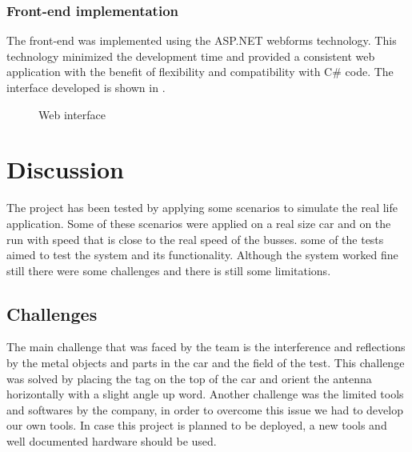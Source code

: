 \documentclass[a4paper,twoside]{IEEEtran}
\begin{document}
\subsubsection{Front-end implementation}
The front-end was implemented using the ASP.NET webforms technology. This technology minimized the development time and provided a consistent web application with the benefit of flexibility and compatibility with C\# code. The interface developed is shown in .
\begin{figure}
\centering
{}
\caption{Web interface}
\label{web}
\end{figure}


\section{Discussion}
The project has been tested by applying some scenarios to simulate the real life application. Some of these scenarios were applied on a real size car and on the run with speed that is close to the real speed of the busses. some of the tests aimed to test the system and its functionality. Although the system worked fine still there were some challenges and there is still some limitations.
\subsection{Challenges}
The main challenge that was faced by the team is the interference and reflections by the metal objects and parts in the car and the field of the test. This challenge was solved by placing the tag on the top of the car and orient the antenna horizontally with a slight angle up word. Another challenge was the limited tools and softwares by the company, in order to overcome this issue we had to develop our own tools. In case this project is planned to be deployed, a new tools and well documented hardware should be used.
\\
\end{document}
